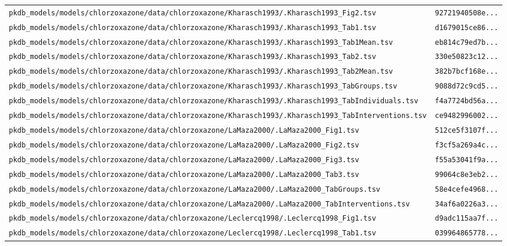 \begin{longtable}{ll}
\texttt{pkdb\_models/models/chlorzoxazone/data/chlorzoxazone/Kharasch1993/.Kharasch1993\_Fig2.tsv} & \texttt{92721940508e...} \\
\texttt{pkdb\_models/models/chlorzoxazone/data/chlorzoxazone/Kharasch1993/.Kharasch1993\_Tab1.tsv} & \texttt{d1679015ce86...} \\
\texttt{pkdb\_models/models/chlorzoxazone/data/chlorzoxazone/Kharasch1993/.Kharasch1993\_Tab1Mean.tsv} & \texttt{eb814c79ed7b...} \\
\texttt{pkdb\_models/models/chlorzoxazone/data/chlorzoxazone/Kharasch1993/.Kharasch1993\_Tab2.tsv} & \texttt{330e50823c12...} \\
\texttt{pkdb\_models/models/chlorzoxazone/data/chlorzoxazone/Kharasch1993/.Kharasch1993\_Tab2Mean.tsv} & \texttt{382b7bcf168e...} \\
\texttt{pkdb\_models/models/chlorzoxazone/data/chlorzoxazone/Kharasch1993/.Kharasch1993\_TabGroups.tsv} & \texttt{9088d72c9cd5...} \\
\texttt{pkdb\_models/models/chlorzoxazone/data/chlorzoxazone/Kharasch1993/.Kharasch1993\_TabIndividuals.tsv} & \texttt{f4a7724bd56a...} \\
\texttt{pkdb\_models/models/chlorzoxazone/data/chlorzoxazone/Kharasch1993/.Kharasch1993\_TabInterventions.tsv} & \texttt{ce9482996002...} \\
\texttt{pkdb\_models/models/chlorzoxazone/data/chlorzoxazone/LaMaza2000/.LaMaza2000\_Fig1.tsv} & \texttt{512ce5f3107f...} \\
\texttt{pkdb\_models/models/chlorzoxazone/data/chlorzoxazone/LaMaza2000/.LaMaza2000\_Fig2.tsv} & \texttt{f3cf5a269a4c...} \\
\texttt{pkdb\_models/models/chlorzoxazone/data/chlorzoxazone/LaMaza2000/.LaMaza2000\_Fig3.tsv} & \texttt{f55a53041f9a...} \\
\texttt{pkdb\_models/models/chlorzoxazone/data/chlorzoxazone/LaMaza2000/.LaMaza2000\_Tab3.tsv} & \texttt{99064c8e3eb2...} \\
\texttt{pkdb\_models/models/chlorzoxazone/data/chlorzoxazone/LaMaza2000/.LaMaza2000\_TabGroups.tsv} & \texttt{58e4cefe4968...} \\
\texttt{pkdb\_models/models/chlorzoxazone/data/chlorzoxazone/LaMaza2000/.LaMaza2000\_TabInterventions.tsv} & \texttt{34af6a0226a3...} \\
\texttt{pkdb\_models/models/chlorzoxazone/data/chlorzoxazone/Leclercq1998/.Leclercq1998\_Fig1.tsv} & \texttt{d9adc115aa7f...} \\
\texttt{pkdb\_models/models/chlorzoxazone/data/chlorzoxazone/Leclercq1998/.Leclercq1998\_Tab1.tsv} & \texttt{039964865778...} \\

\end{longtable}
